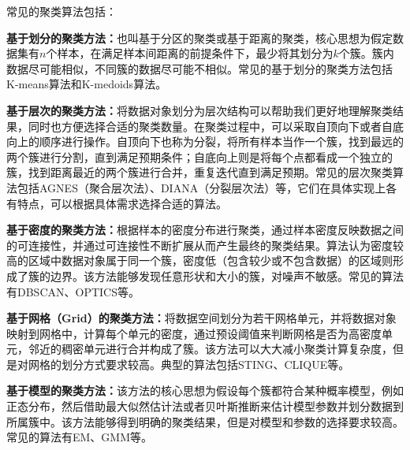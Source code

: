 常见的聚类算法包括：
\begin{compactitem}
	\item
	\textbf{基于划分的聚类方法：}也叫基于分区的聚类或基于距离的聚类，核心思想为假定数据集有$ n $个样本，在满足样本间距离的前提条件下，最少将其划分为$ k $个簇。簇内数据尽可能相似，不同簇的数据尽可能不相似。常见的基于划分的聚类方法包括K-means算法和K-medoids算法。
	\item
	\textbf{基于层次的聚类方法：}将数据对象划分为层次结构可以帮助我们更好地理解聚类结果，同时也方便选择合适的聚类数量。在聚类过程中，可以采取自顶向下或者自底向上的顺序进行操作。自顶向下也称为分裂，将所有样本当作一个簇，找到最远的两个簇进行分割，直到满足预期条件；自底向上则是将每个点都看成一个独立的簇，找到距离最近的两个簇进行合并，重复迭代直到满足预期。常见的层次聚类算法包括AGNES（聚合层次法）、DIANA（分裂层次法）等，它们在具体实现上各有特点，可以根据具体需求选择合适的算法。%
	\item
	\textbf{基于密度的聚类方法：}根据样本的密度分布进行聚类，通过样本密度反映数据之间的可连接性，并通过可连接性不断扩展从而产生最终的聚类结果。算法认为密度较高的区域中数据对象属于同一个簇，密度低（包含较少或不包含数据）的区域则形成了簇的边界。该方法能够发现任意形状和大小的簇，对噪声不敏感。常见的算法有DBSCAN、OPTICS等。
	\item
	\textbf{基于网格（Grid）的聚类方法：}将数据空间划分为若干网格单元，并将数据对象映射到网格中，计算每个单元的密度，通过预设阈值来判断网格是否为高密度单元，邻近的稠密单元进行合并构成了簇。该方法可以大大减小聚类计算复杂度，但是对网格的划分方式要求较高。典型的算法包括STING、CLIQUE等。
	\item
	\textbf{基于模型的聚类方法：}该方法的核心思想为假设每个簇都符合某种概率模型，例如正态分布，然后借助最大似然估计法或者贝叶斯推断来估计模型参数并划分数据到所属簇中。该方法能够得到明确的聚类结果，但是对模型和参数的选择要求较高。常见的算法有EM、GMM等。
\end{compactitem}

